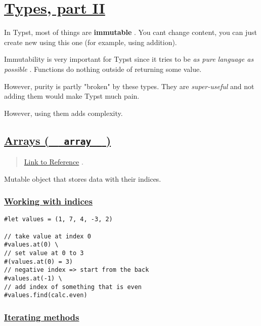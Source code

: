 \section{\texorpdfstring{\hyperref[types-part-ii]{Types, part
II}}{Types, part II}}\label{types-part-ii}

In Typst, most of things are \textbf{immutable} . You
can\textquotesingle t change content, you can just create new using this
one (for example, using addition).

Immutability is very important for Typst since it tries to be \emph{as
pure language as possible} . Functions do nothing outside of returning
some value.

However, purity is partly "broken" by these types. They are
\emph{super-useful} and not adding them would make Typst much pain.

However, using them adds complexity.

\subsection{\texorpdfstring{\hyperref[arrays-array]{Arrays (
\texttt{\ }{\texttt{\ array\ }}\texttt{\ }
)}}{Arrays (   array   )}}\label{arrays-array}

\begin{quote}
\href{https://typst.app/docs/reference/foundations/array/}{Link to
Reference} .
\end{quote}

Mutable object that stores data with their indices.

\subsubsection{\texorpdfstring{\hyperref[working-with-indices]{Working
with indices}}{Working with indices}}\label{working-with-indices}

\begin{verbatim}
#let values = (1, 7, 4, -3, 2)

// take value at index 0
#values.at(0) \
// set value at 0 to 3
#(values.at(0) = 3)
// negative index => start from the back
#values.at(-1) \
// add index of something that is even
#values.find(calc.even)
\end{verbatim}

\pandocbounded{}

\subsubsection{\texorpdfstring{\hyperref[iterating-methods]{Iterating
methods}}{Iterating methods}}\label{iterating-methods}


